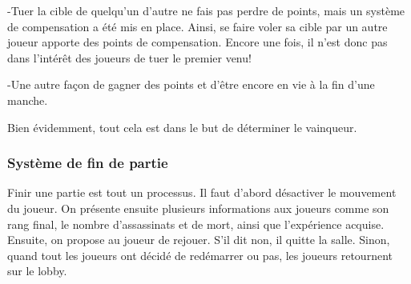 	-Tuer la cible de quelqu'un d'autre ne fais pas perdre de points, mais un système de compensation a été mis en place. Ainsi, se 	faire voler sa cible par un autre joueur apporte des points de compensation. Encore une fois, il n'est donc pas dans l'intérêt 
	des joueurs de tuer le premier venu!

	-Une autre façon de gagner des points et d'être encore en vie à la fin d'une manche.

    Bien évidemment, tout cela est dans le but de déterminer le vainqueur.
	
\subsubsection{Système de fin de partie}
	Finir une partie est tout un processus. Il faut d'abord désactiver le mouvement du joueur.
	On présente ensuite plusieurs informations aux joueurs comme son rang final, le nombre d'assassinats
	et de mort, ainsi que l'expérience acquise. Ensuite, on propose au joueur de rejouer. S'il dit non, il quitte la salle.
	Sinon, quand tout les joueurs ont décidé de redémarrer ou pas, les joueurs retournent sur le lobby.
